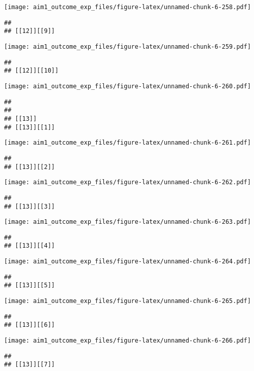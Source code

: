 \documentclass[
]{article}
\begin{document}
\texttt{[image: aim1\_outcome\_exp\_files/figure-latex/unnamed-chunk-6-258.pdf]}

\begin{verbatim}
## 
## [[12]][[9]]
\end{verbatim}

\texttt{[image: aim1\_outcome\_exp\_files/figure-latex/unnamed-chunk-6-259.pdf]}

\begin{verbatim}
## 
## [[12]][[10]]
\end{verbatim}

\texttt{[image: aim1\_outcome\_exp\_files/figure-latex/unnamed-chunk-6-260.pdf]}

\begin{verbatim}
## 
## 
## [[13]]
## [[13]][[1]]
\end{verbatim}

\texttt{[image: aim1\_outcome\_exp\_files/figure-latex/unnamed-chunk-6-261.pdf]}

\begin{verbatim}
## 
## [[13]][[2]]
\end{verbatim}

\texttt{[image: aim1\_outcome\_exp\_files/figure-latex/unnamed-chunk-6-262.pdf]}

\begin{verbatim}
## 
## [[13]][[3]]
\end{verbatim}

\texttt{[image: aim1\_outcome\_exp\_files/figure-latex/unnamed-chunk-6-263.pdf]}

\begin{verbatim}
## 
## [[13]][[4]]
\end{verbatim}

\texttt{[image: aim1\_outcome\_exp\_files/figure-latex/unnamed-chunk-6-264.pdf]}

\begin{verbatim}
## 
## [[13]][[5]]
\end{verbatim}

\texttt{[image: aim1\_outcome\_exp\_files/figure-latex/unnamed-chunk-6-265.pdf]}

\begin{verbatim}
## 
## [[13]][[6]]
\end{verbatim}

\texttt{[image: aim1\_outcome\_exp\_files/figure-latex/unnamed-chunk-6-266.pdf]}

\begin{verbatim}
## 
## [[13]][[7]]
\end{verbatim}
\end{document}
